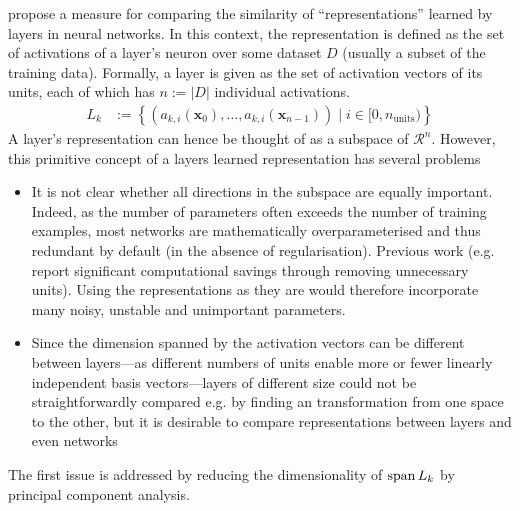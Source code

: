 \citet{raghu2017svcca} propose a measure for comparing the similarity of
``representations'' learned by layers in neural networks. In this context, the
representation is defined as the set of activations of a layer's neuron over
some dataset $D$ (usually a subset of the training data). Formally, a layer is given
as the set of activation vectors of its units, each of which has $n := |D|$ individual
activations.
\begin{align}
    L_k & :=  \left\{ (a_{k,i}(\mathbf{x}_0), \ldots, a_{k,i}(\mathbf{x}_{n-1})) \mid i \in [0,n_\text{units})\right\}
\end{align}
A layer's representation can hence be thought of as a subspace of
$\mathcal{R}^n$. However, this primitive concept of a layers learned
representation has several problems
\begin{itemize}
    \item It is not clear whether all directions in the subspace are equally
        important. Indeed, as the number of parameters often exceeds the number
        of training examples, most networks are mathematically overparameterised
        and thus redundant by default (in the absence of regularisation).
        Previous work (e.g.
        \citet{lecun1990optimal,srinivas2015data,molchanov2016pruning} report
        significant computational savings through removing unnecessary units).
        Using the representations as they are would therefore incorporate many
        noisy, unstable and unimportant parameters.
    \item Since the dimension spanned by the activation vectors can be different
        between layers---as different numbers of units enable more or fewer
        linearly independent basis vectors---layers of different size could not
        be straightforwardly compared e.g. by finding an transformation from one
        space to the other, but it is desirable to compare representations
        between layers and even networks
\end{itemize}

The first issue is addressed by reducing the dimensionality of $\operatorname{span}{L_k}$ by
principal component analysis.


